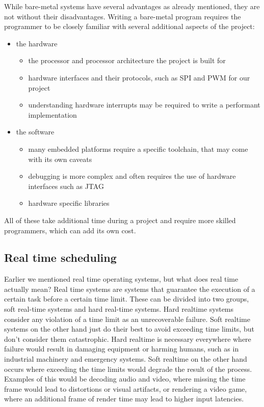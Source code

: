 While bare-metal systems have several advantages as already mentioned, they are not without their disadvantages.
Writing a bare-metal program requires the programmer to be closely familiar with several additional aspects of the project:
\begin{itemize}
    \item the hardware
    \begin{itemize}
        \item the processor and processor architecture the project is built for
        \item hardware interfaces and their protocols, such as SPI and PWM for our project
        \item understanding hardware interrupts may be required to write a performant implementation
    \end{itemize}
    \item the software
    \begin{itemize}
        \item many embedded platforms require a specific toolchain, that may come with its own caveats
        \item debugging is more complex and often requires the use of hardware interfaces such as JTAG
        \item hardware specific libraries
    \end{itemize}
\end{itemize}
All of these take additional time during a project and require more skilled programmers, which can add its own cost.

\subsection{Real time scheduling}
\label{sec:background:bm_vs_os:rtos}

Earlier we mentioned real time operating systems, but what does real time actually mean?
Real time systems are systems that guarantee the execution of a certain task before a certain time limit.
These can be divided into two groups, soft real-time systems and hard real-time systems.
Hard realtime systems consider any violation of a time limit as an unrecoverable failure.
Soft realtime systems on the other hand just do their best to avoid exceeding time limits, but don't consider them catastrophic.
Hard realtime is necessary everywhere where failure would result in damaging equipment or harming humans, such as in industrial machinery and emergency systems.
Soft realtime on the other hand occurs where exceeding the time limits would degrade the result of the process.
Examples of this would be decoding audio and video, where missing the time frame would lead to distortions or visual artifacts,
or rendering a video game, where an additional frame of render time may lead to higher input latencies.

